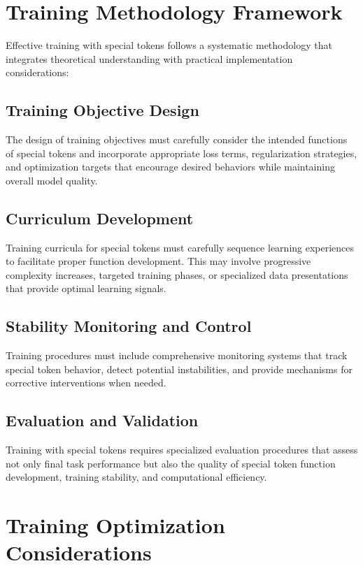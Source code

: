\section{Training Methodology Framework}

Effective training with special tokens follows a systematic methodology that integrates theoretical understanding with practical implementation considerations:

\subsection{Training Objective Design}

The design of training objectives must carefully consider the intended functions of special tokens and incorporate appropriate loss terms, regularization strategies, and optimization targets that encourage desired behaviors while maintaining overall model quality.

\subsection{Curriculum Development}

Training curricula for special tokens must carefully sequence learning experiences to facilitate proper function development. This may involve progressive complexity increases, targeted training phases, or specialized data presentations that provide optimal learning signals.

\subsection{Stability Monitoring and Control}

Training procedures must include comprehensive monitoring systems that track special token behavior, detect potential instabilities, and provide mechanisms for corrective interventions when needed.

\subsection{Evaluation and Validation}

Training with special tokens requires specialized evaluation procedures that assess not only final task performance but also the quality of special token function development, training stability, and computational efficiency.

\section{Training Optimization Considerations}

